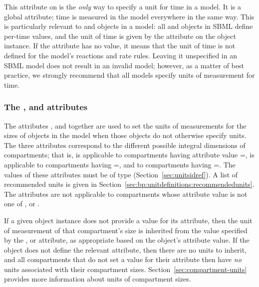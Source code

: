 This attribute on \Model is the \emph{only} way to specify a unit
for time in a model.  It is a global attribute; time is measured
in the model everywhere in the same way.  This is particularly
relevant to \Reaction and \RateRule objects in a model: all
\Reaction and \RateRule objects in SBML define per-time values,
and the unit of time is given by the  attribute
on the \Model object instance.  If the \Model {}
attribute has no value, it means that the unit of time is not
defined for the model's reactions and rate rules.  Leaving it
unspecified in an SBML model does not result in an invalid model;
however, as a matter of best practice, we strongly recommend that
all models specify units of measurement for time.


\subsubsection{The ,  and
   attributes}
\label{sec:model-volumeUnits}
\label{sec:model-areaUnits}
\label{sec:model-lengthUnits}
\label{volumeunits}
\label{areaunits}
\label{lengthunits}

The attributes ,  and
 together are used to set the units of
measurements for the sizes of \Compartment objects in the model
when those objects do not otherwise specify units.  The three
attributes correspond to the different possible integral
dimensions of compartments; that is,  is
applicable to compartments having attribute value
=,  is applicable
to compartments having =, and
 to compartments having
=.  The values of these attributes
must be of type 
(Section~\ref{sec:unitsidref}).  A list of recommended units is
given in Section~\ref{sec:bp:unitdefinitions:recommendedunits}.
The attributes are not applicable to compartments whose
 attribute value is not one of ,
 or .

If a given \Compartment object instance does not provide a value
for its  attribute, then the unit of measurement of
that compartment's size is inherited from the value specified by
the \Model {},  or
 attribute, as appropriate based on the
\Compartment object's  attribute value.
If the \Model object does not define the relevant attribute, then
there are no units to inherit, and all compartments that do not
set a value for their  attribute then have \emph{no}
units associated with their compartment sizes.
Section~\ref{sec:compartment-units} provides more information
about units of compartment sizes.

